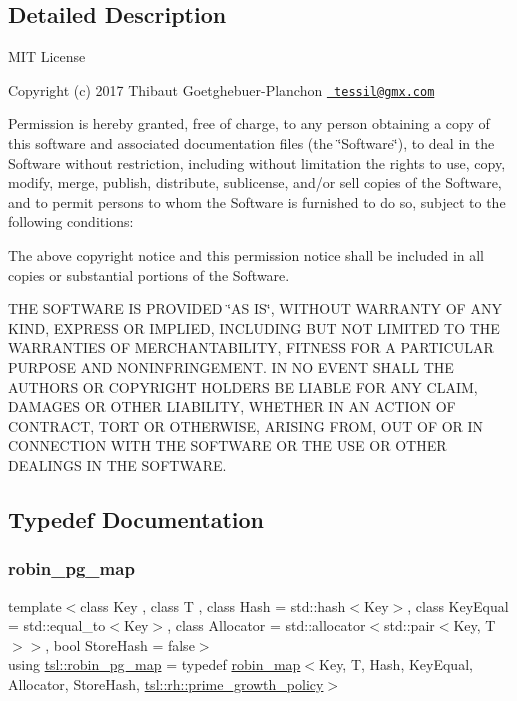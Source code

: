 \subsection{Detailed Description}
M\+IT License

Copyright (c) 2017 Thibaut Goetghebuer-\/\+Planchon \href{mailto:tessil@gmx.com}{\texttt{ tessil@gmx.\+com}}

Permission is hereby granted, free of charge, to any person obtaining a copy of this software and associated documentation files (the \char`\"{}\+Software\char`\"{}), to deal in the Software without restriction, including without limitation the rights to use, copy, modify, merge, publish, distribute, sublicense, and/or sell copies of the Software, and to permit persons to whom the Software is furnished to do so, subject to the following conditions\+:

The above copyright notice and this permission notice shall be included in all copies or substantial portions of the Software.

T\+HE S\+O\+F\+T\+W\+A\+RE IS P\+R\+O\+V\+I\+D\+ED \char`\"{}\+A\+S I\+S\char`\"{}, W\+I\+T\+H\+O\+UT W\+A\+R\+R\+A\+N\+TY OF A\+NY K\+I\+ND, E\+X\+P\+R\+E\+SS OR I\+M\+P\+L\+I\+ED, I\+N\+C\+L\+U\+D\+I\+NG B\+UT N\+OT L\+I\+M\+I\+T\+ED TO T\+HE W\+A\+R\+R\+A\+N\+T\+I\+ES OF M\+E\+R\+C\+H\+A\+N\+T\+A\+B\+I\+L\+I\+TY, F\+I\+T\+N\+E\+SS F\+OR A P\+A\+R\+T\+I\+C\+U\+L\+AR P\+U\+R\+P\+O\+SE A\+ND N\+O\+N\+I\+N\+F\+R\+I\+N\+G\+E\+M\+E\+NT. IN NO E\+V\+E\+NT S\+H\+A\+LL T\+HE A\+U\+T\+H\+O\+RS OR C\+O\+P\+Y\+R\+I\+G\+HT H\+O\+L\+D\+E\+RS BE L\+I\+A\+B\+LE F\+OR A\+NY C\+L\+A\+IM, D\+A\+M\+A\+G\+ES OR O\+T\+H\+ER L\+I\+A\+B\+I\+L\+I\+TY, W\+H\+E\+T\+H\+ER IN AN A\+C\+T\+I\+ON OF C\+O\+N\+T\+R\+A\+CT, T\+O\+RT OR O\+T\+H\+E\+R\+W\+I\+SE, A\+R\+I\+S\+I\+NG F\+R\+OM, O\+UT OF OR IN C\+O\+N\+N\+E\+C\+T\+I\+ON W\+I\+TH T\+HE S\+O\+F\+T\+W\+A\+RE OR T\+HE U\+SE OR O\+T\+H\+ER D\+E\+A\+L\+I\+N\+GS IN T\+HE S\+O\+F\+T\+W\+A\+RE. 

\subsection{Typedef Documentation}
\mbox{\label{namespacetsl_a34add5a78d6478dcfd62fc4f8115275f}} 
\subsubsection{\texorpdfstring{robin\_pg\_map}{robin\_pg\_map}}
{\footnotesize\ttfamily template$<$class Key , class T , class Hash  = std\+::hash$<$\+Key$>$, class Key\+Equal  = std\+::equal\+\_\+to$<$\+Key$>$, class Allocator  = std\+::allocator$<$std\+::pair$<$\+Key, T$>$$>$, bool Store\+Hash = false$>$ \\
using \mbox{\hyperlink{namespacetsl_a34add5a78d6478dcfd62fc4f8115275f}{tsl\+::robin\+\_\+pg\+\_\+map}} = typedef \mbox{\hyperlink{classtsl_1_1robin__map}{robin\+\_\+map}}$<$Key, T, Hash, Key\+Equal, Allocator, Store\+Hash, \mbox{\hyperlink{classtsl_1_1rh_1_1prime__growth__policy}{tsl\+::rh\+::prime\+\_\+growth\+\_\+policy}}$>$}

